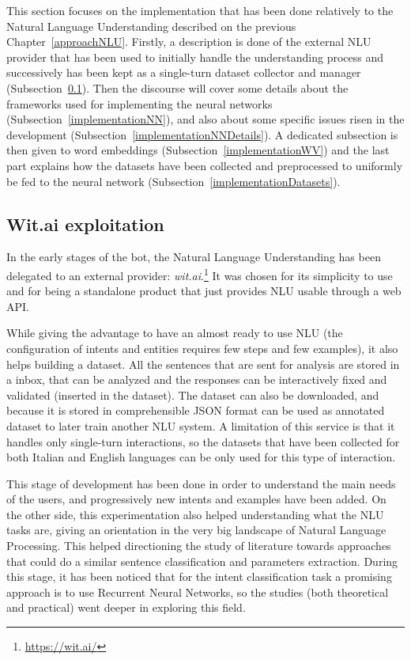 This section focuses on the implementation that has been done relatively to the Natural Language Understanding described on the previous Chapter~\ref{approachNLU}. Firstly, a description is done of the external NLU provider that has been used to initially handle the understanding process and successively has been kept as a single-turn dataset collector and manager (Subsection~\ref{implementationWit}). Then the discourse will cover some details about the frameworks used for implementing the neural networks (Subsection~\ref{implementationNN}), and also about some specific issues risen in the development (Subsection~\ref{implementationNNDetails}). A dedicated subsection is then given to word embeddings (Subsection~\ref{implementationWV}) and the last part explains how the datasets have been collected and preprocessed to uniformly be fed to the neural network (Subsection~\ref{implementationDatasets}).

\subsection{Wit.ai exploitation}
\label{implementationWit}

In the early stages of the bot, the Natural Language Understanding has been delegated to an external provider: \textit{wit.ai}.\footnote{\url{https://wit.ai/}} It was chosen for its simplicity to use and for being a standalone product that just provides NLU usable through a web API.

While giving the advantage to have an almost ready to use NLU (the configuration of intents and entities requires few steps and few examples), it also helps building a dataset. All the sentences that are sent for analysis are stored in a inbox, that can be analyzed and the responses can be interactively fixed and validated (inserted in the dataset). The dataset can also be downloaded, and because it is stored in comprehensible JSON format can be used as annotated dataset to later train another NLU system. A limitation of this service is that it handles only single-turn interactions, so the datasets that have been collected for both Italian and English languages can be only used for this type of interaction.

This stage of development has been done in order to understand the main needs of the users, and progressively new intents and examples have been added. On the other side, this experimentation also helped understanding what the NLU tasks are, giving an orientation in the very big landscape of Natural Language Processing. This helped directioning the study of literature towards approaches that could do a similar sentence classification and parameters extraction. During this stage, it has been noticed that for the intent classification task a promising approach is to use Recurrent Neural Networks, so the studies (both theoretical and practical) went deeper in exploring this field.

